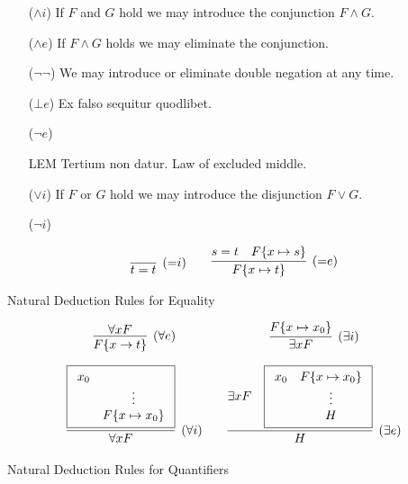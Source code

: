 \begin{itemize}
	\item[($\land i$)] If $F$ and $G$ hold we may introduce the conjunction $F\land G$.
	\item[($\land e$)] If $F \land G$ holds we may eliminate the conjunction.
	\item[($\lnot\lnot$)] We may introduce or eliminate double negation at any time.
	\item[($\bot e$)] Ex falso sequitur quodlibet. 
	\item[($\lnot e$)] 
	\item[LEM] Tertium non datur. Law of excluded middle.
	\item[($\lor i$)] If $F$ or $G$ hold we may introduce the disjunction $F\lor G$.
	\item[($\lnot i$)] 
\end{itemize}

\begin{table}[hbt]
	\begin{gather*}
	\infer[({=}i)]{t=t}{}
	\qquad
	\infer[({=}e)]{F\{x\mapsto t\}}{s=t & F\{x\mapsto s\}}
	\end{gather*}
	\caption{Natural Deduction Rules for Equality}
	\label{tab:natural:deduction:equality}
\end{table}

\begin{table}[hbt]
	\begin{gather*}
	\begin{array}{ccc}
	\infer[(\forall e)]{F\{x\to t\}}{
		\forall x F
	}
	&&
		\infer[(\exists i)]{\exists x F}{
		F\{x\mapsto x_0 \}
	}
	\\[1em]
	\infer[(\forall i)]{\forall x F}{
		\boxed{\begin{array}{cc}x_0\\&\vdots\\&F\{x\mapsto x_0\}\end{array}}
	}
	&&
	\infer[(\exists e)]{H}{
		\exists x F &
		\boxed{\begin{array}{cc}x_0&F\{x\mapsto x_0 \}\\&\vdots\\&H\end{array}}
	}
	\end{array}
	\end{gather*}
	\caption{Natural Deduction Rules for Quantifiers}
	\label{tab:natural:deduction:quantifiers}
\end{table}
